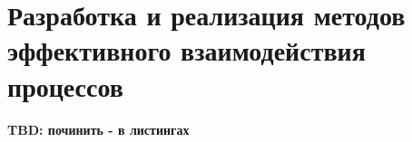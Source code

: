 \chapter{Разработка и реализация методов эффективного взаимодействия процессов}
\textbf{TBD: починить - в листингах}
%
%
%
%
%
%
%
